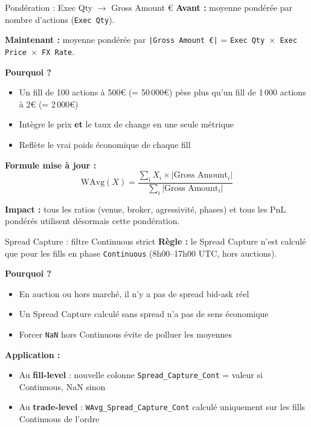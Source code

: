 \documentclass[10pt]{beamer}
\begin{document}
\begin{frame}{Pondération : Exec Qty $\rightarrow$ Gross Amount \euro{}}
\textbf{Avant :} moyenne pondérée par nombre d'actions (\texttt{Exec Qty}).

\textbf{Maintenant :} moyenne pondérée par \texttt{|Gross Amount \euro{}|} = \texttt{Exec Qty $\times$ Exec Price $\times$ FX Rate}.

\vspace{0.3cm}
\textbf{Pourquoi ?}
\begin{itemize}
    \item Un fill de 100 actions à 500\euro{} (= 50\,000\euro{}) pèse plus qu'un fill de 1\,000 actions à 2\euro{} (= 2\,000\euro{})
    \item Intègre le prix \textbf{et} le taux de change en une seule métrique
    \item Reflète le vrai poids économique de chaque fill
\end{itemize}

\vspace{0.3cm}
\textbf{Formule mise à jour :}
$$\text{WAvg}(X) = \frac{\sum_{i} X_i \times |\text{Gross Amount}_i|}{\sum_{i} |\text{Gross Amount}_i|}$$

\textbf{Impact :} tous les ratios (venue, broker, agressivité, phases) et tous les PnL pondérés utilisent désormais cette pondération.
\end{frame}

\begin{frame}{Spread Capture : filtre Continuous strict}
\textbf{Règle :} le Spread Capture n'est calculé que pour les fills en phase \texttt{Continuous} (8h00--17h00 UTC, hors auctions).

\vspace{0.3cm}
\textbf{Pourquoi ?}
\begin{itemize}
    \item En auction ou hors marché, il n'y a pas de spread bid-ask réel
    \item Un Spread Capture calculé sans spread n'a pas de sens économique
    \item Forcer \texttt{NaN} hors Continuous évite de polluer les moyennes
\end{itemize}

\vspace{0.3cm}
\textbf{Application :}
\begin{itemize}
    \item Au \textbf{fill-level} : nouvelle colonne \texttt{Spread\_Capture\_Cont} = valeur si Continuous, NaN sinon
    \item Au \textbf{trade-level} : \texttt{WAvg\_Spread\_Capture\_Cont} calculé uniquement sur les fills Continuous de l'ordre
\end{itemize}
\end{frame}
\end{document}
